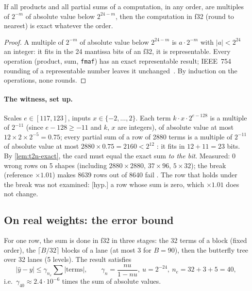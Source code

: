 \begin{lemme}\label{lem:t2n-exact}
If all products and all partial sums of a computation, in any order, are multiples of $2^{-m}$ of absolute value below $2^{24 - m}$, then the computation in f32 (round to nearest) is exact whatever the order.
\end{lemme}

\begin{proof}
A multiple of $2^{-m}$ of absolute value below $2^{24-m}$ is $a \cdot 2^{-m}$ with $|a| < 2^{24}$ an integer: it fits in the 24 mantissa bits of an f32, it is representable. Every operation (product, sum, \texttt{fmaf}) has an exact representable result; IEEE~754 rounding of a representable number leaves it unchanged~\cite{ieee754-2019}. By induction on the operations, none rounds.
\end{proof}

\paragraph{The witness, set up.} Scales $e \in [117, 123]$, inputs $x \in \{-2, \ldots, 2\}$. Each term $k \cdot x \cdot 2^{e - 128}$ is a multiple of $2^{-11}$ (since $e - 128 \ge -11$ and $k$, $x$ are integers), of absolute value at most $12 \times 2 \times 2^{-5} = 0.75$; every partial sum of a row of \num{2880} terms is a multiple of $2^{-11}$ of absolute value at most $\num{2880} \times 0.75 = \num{2160} < 2^{12}$ \calc: it fits in $12 + 11 = 23$ bits. By \cref{lem:t2n-exact}, the card must equal the exact sum \emph{to the bit}. Measured: 0 wrong rows on 5 shapes (including $\num{2880} \times \num{2880}$, $37 \times 96$, $5 \times 32$); the break (reference $\times 1.01$) makes \num{8639} rows out of \num{8640} fail \mes. The row that holds under the break was not examined: [hyp.] a row whose sum is zero, which $\times 1.01$ does not change.

\subsection{On real weights: the error bound}

\begin{proposition}\label{prop:t2n-borne-gemv}
For one row, the sum is done in f32 in three stages: the 32 terms of a block (fixed order), the $\lceil B/32 \rceil$ blocks of a lane (at most 3 for $B = 90$), then the butterfly tree over 32 lanes (5 levels). The result satisfies
\[
|\hat y - y| \le \gamma_{n_e} \sum |\text{terms}|, \qquad \gamma_n = \frac{n u}{1 - n u},\ u = 2^{-24},\ n_e = 32 + 3 + 5 = 40,
\]
i.e.\ $\gamma_{40} \approx 2.4\cdot10^{-6}$ times the sum of absolute values.
\end{proposition}

